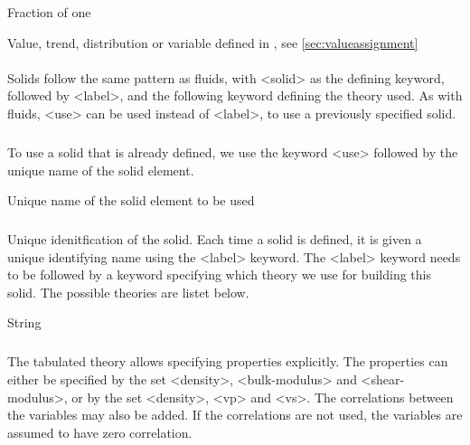 {
 \slist
   \item \Description Fraction of one
   \item \Argument Value, trend, distribution or variable defined in , see \autoref{sec:valueassignment}
   \item \Default
 \elist

\paragraph{}
 \slist
   \item \Description Solids follow the same pattern as fluids, with <solid> as the defining keyword, followed by <label>, and the following keyword defining the theory used. As with fluids, <use> can be used instead of <label>, to use a previously specified solid.
   \item \Argument 
   \item \Default 
 \elist

\subparagraph{}
 \slist
   \item \Description  To use a solid that is already defined, we use the keyword <use> followed by the unique name of the solid element.
   \item \Argument Unique name of the solid element to be used
   \item \Default 
 \elist

\subparagraph{}
 \slist
   \item \Description Unique idenitfication of the solid. Each time a solid is defined, it is given a unique identifying name using
the <label> keyword. The <label> keyword needs to be followed by a keyword specifying which theory we use for building this solid. The possible theories are listet below. 
   \item \Argument String
   \item \Default 
 \elist

\subparagraph{}
 \slist
   \item \Description The tabulated theory allows specifying properties explicitly. The properties can either be specified by the set <density>, <bulk-modulus> and <shear-modulus>, or by the set <density>, <vp> and <vs>. The correlations between the variables may also be added. If the correlations are not used, the variables are assumed to have zero correlation. 
   \item \Argument
   \item \Default 
 \elist

}
